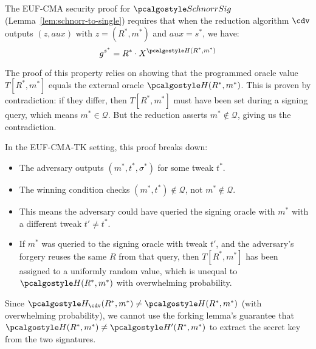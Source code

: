 \ifsolutions
\begin{mysolution}
  The EUF-CMA security proof for $\algo{SchnorrSig}$ (Lemma~\ref{lem:schnorr-to-single}) requires that when the reduction algorithm $\cdv$ outputs $(z, \mathit{aux})$ with $z = (R^*, m^*)$ and $\mathit{aux} = s^*$, we have:
  \[
    g^{s^*} = R^* \cdot X^{\algo{H}(R^*, m^*)}
  \]
  
  The proof of this property relies on showing that the programmed oracle value $T[R^*, m^*]$ equals the external oracle $\algo{H}(R^*, m^*)$.
  This is proven by contradiction: if they differ, then $T[R^*, m^*]$ must have been set during a signing query, which means $m^* \in \mathcal{Q}$.
  But the reduction asserts $m^* \notin \mathcal{Q}$, giving us the contradiction.
  
  In the EUF-CMA-TK setting, this proof breaks down:
  \begin{itemize}
    \item The adversary outputs $(m^*, t^*, \sigma^*)$ for some tweak $t^*$.
    \item The winning condition checks $(m^*, t^*) \notin \mathcal{Q}$, not $m^* \notin \mathcal{Q}$.
    \item This means the adversary could have queried the signing oracle with $m^*$ with a different tweak $t' \neq t^*$.
    \item If $m^*$ was queried to the signing oracle with tweak $t'$, and the adversary's forgery reuses the same $R$ from that query, then $T[R^*, m^*]$ has been assigned to a uniformly random value, which is unequal to $\algo{H}(R^*, m^*)$ with overwhelming probability.
  \end{itemize}
  
  Since $\algo{H}_{\cdv}(R^*, m^*) \neq \algo{H}(R^*, m^*)$ (with overwhelming probability), we cannot use the forking lemma's guarantee that $\algo{H}(R^*, m^*) \neq \algo{H}'(R^*, m^*)$ to extract the secret key from the two signatures.
\end{mysolution}
\fi

